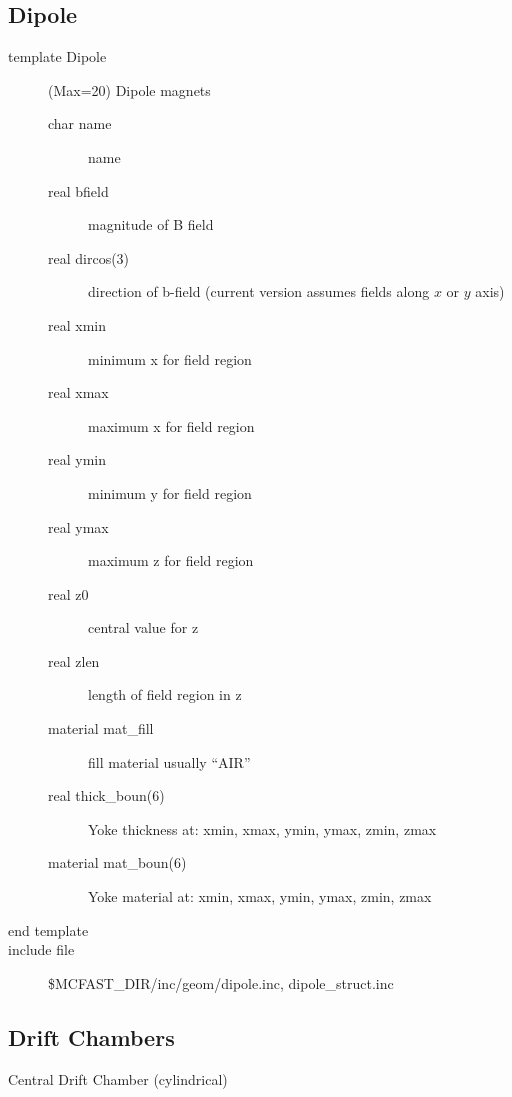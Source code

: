 \subsection{Dipole}

\begin{description}
\item[{\rm template} Dipole](Max=20)  Dipole magnets
\begin{description}
\item[{\rm  char} name]     name
\item[{\rm  real} bfield]   magnitude of B field
\item[{\rm  real} dircos(3)]  direction of b-field  (current version assumes 
fields along $x$ or $y$ axis)
\item[{\rm  real} xmin]  minimum x for field region 
\item[{\rm  real} xmax]  maximum x for field region
\item[{\rm  real} ymin]  minimum y for field region
\item[{\rm  real} ymax]  maximum z for field region
\item[{\rm  real} z0]    central value for z
\item[{\rm  real} zlen]  length of field region in z
\item[{\rm  material} mat\_fill]  fill material usually ``AIR''
\item[{\rm  real} thick\_boun(6)]  Yoke thickness at: xmin, xmax, ymin, ymax, zmin, zmax  
\item[{\rm  material} mat\_boun(6)]  Yoke material at: xmin, xmax, ymin, ymax, zmin, zmax
\end{description}
\item[end template]
\item[include file] \$MCFAST\_DIR/inc/geom/dipole.inc, dipole\_struct.inc
\end{description}

\filbreak

\subsection{Drift Chambers}  Central Drift Chamber (cylindrical)

